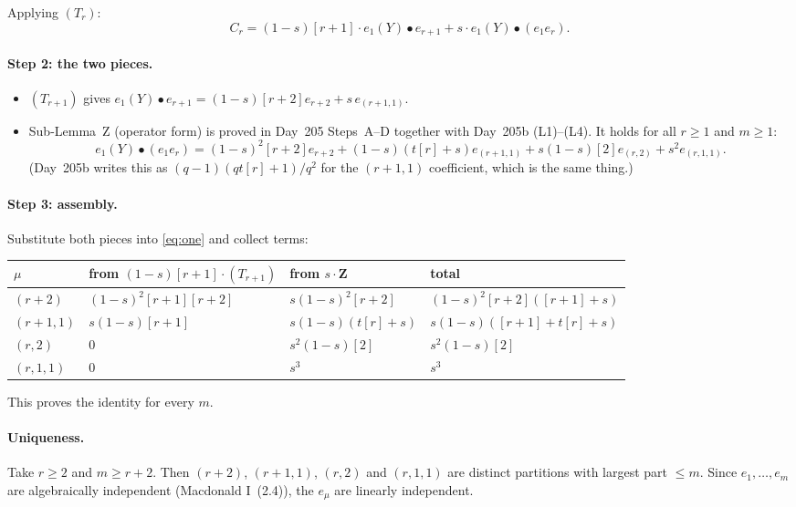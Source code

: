 \documentclass[11pt]{amsart}
\theoremstyle{remark}
\newcommand{\tn}[1]{[#1]}
\begin{document}
Applying $(T_r)$:
\begin{equation}\label{eq:one}
C_r = (1-s)\tn{r+1}\cdot e_1(Y)\bullet e_{r+1} + s\cdot e_1(Y)\bullet(e_1e_r).
\end{equation}

\paragraph{Step 2: the two pieces.}
\begin{itemize}
\item $(T_{r+1})$ gives $e_1(Y)\bullet e_{r+1}=(1-s)\tn{r+2}e_{r+2}+s\,e_{(r+1,1)}$.
\item Sub-Lemma~Z (operator form) is proved in Day~205 Steps~A--D together with Day~205b (L1)--(L4). It holds for all $r\ge1$ and $m\ge1$:
\[
e_1(Y)\bullet(e_1e_r) = (1-s)^2\tn{r+2}e_{r+2} + (1-s)(t\tn{r}+s)e_{(r+1,1)} + s(1-s)\tn{2}e_{(r,2)} + s^2e_{(r,1,1)}.
\]
(Day~205b writes this as $(q-1)(qt\tn{r}+1)/q^2$ for the $(r+1,1)$ coefficient, which is the same thing.)
\end{itemize}

\paragraph{Step 3: assembly.} Substitute both pieces into \eqref{eq:one} and collect terms:
\begin{center}
\renewcommand{\arraystretch}{1.3}
\begin{tabular}{@{}llll@{}}
\toprule
$\mu$ & from $(1-s)\tn{r+1}\cdot(T_{r+1})$ & from $s\cdot$Z & total\\
\midrule
$(r+2)$ & $(1-s)^2\tn{r+1}\tn{r+2}$ & $s(1-s)^2\tn{r+2}$ & $(1-s)^2\tn{r+2}(\tn{r+1}+s)$\\
$(r+1,1)$ & $s(1-s)\tn{r+1}$ & $s(1-s)(t\tn{r}+s)$ & $s(1-s)(\tn{r+1}+t\tn{r}+s)$\\
$(r,2)$ & $0$ & $s^2(1-s)\tn{2}$ & $s^2(1-s)\tn{2}$\\
$(r,1,1)$ & $0$ & $s^3$ & $s^3$\\
\bottomrule
\end{tabular}
\end{center}
This proves the identity for every $m$.

\paragraph{Uniqueness.} Take $r\ge2$ and $m\ge r+2$. Then $(r+2)$, $(r+1,1)$, $(r,2)$ and $(r,1,1)$ are distinct partitions with largest part $\le m$. Since $e_1,\dots,e_m$ are algebraically independent (Macdonald I~(2.4)), the $e_\mu$ are linearly independent.
\end{document}
